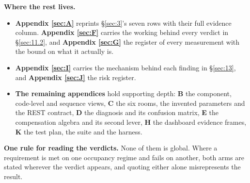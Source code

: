 \begin{center}
{{\textbf{Where the rest lives.}
\begin{itemize}\tightlist
\item \textbf{Appendix \ref{sec:A}} reprints \S\ref{sec:3}'s seven rows with their full evidence column.
  \textbf{Appendix \ref{sec:F}} carries the working behind every verdict in \S\ref{sec:11.2}, and \textbf{Appendix \ref{sec:G}}
  the register of every measurement with the bound on what it actually is.
\item \textbf{Appendix \ref{sec:I}} carries the mechanism behind each finding in \S\ref{sec:13}, and \textbf{Appendix
  \ref{sec:J}} the risk register.
\item \textbf{The remaining appendices} hold supporting depth: \textbf{B} the component,
  code-level and sequence views, \textbf{C} the six rooms, the invented parameters and the REST
  contract, \textbf{D} the diagnosis and its confusion matrix, \textbf{E} the compensation algebra
  and its second lever, \textbf{H} the dashboard evidence frames, \textbf{K} the test plan, the
  suite and the harness.
\end{itemize}
\textbf{One rule for reading the verdicts.} None of them is global. Where a requirement is met on one
occupancy regime and fails on another, both arms are stated wherever the verdict appears, and quoting
either alone misrepresents the result.}}
\end{center}

\vspace{1em}
